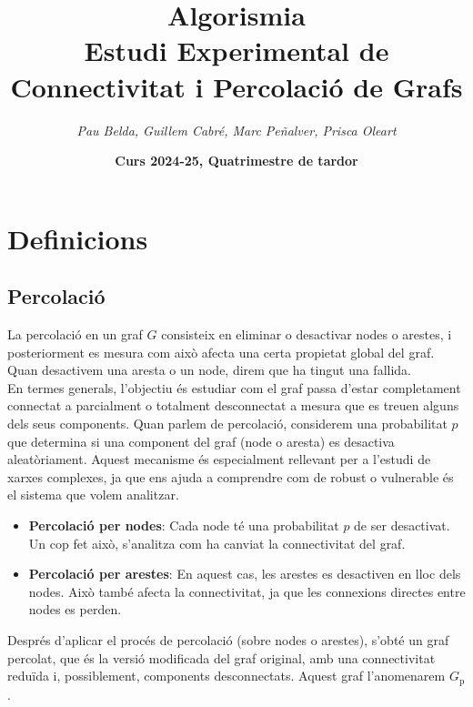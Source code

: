 \documentclass[a4paper]{article}
\title{\textbf{\huge Algorismia}\\[0.5cm]
	\textbf{\Large Estudi Experimental de Connectivitat i Percolació de Grafs}}
\author{\emph{Pau Belda, Guillem Cabré, Marc Peñalver, Prisca Oleart}}
\date{\textbf{Curs 2024-25, Quatrimestre de tardor}}
\begin{document}
	
	\begin{titlepage}
		\clearpage\maketitle
		\thispagestyle{empty}
	\end{titlepage}
	
	\tableofcontents
	\clearpage
	
	\section{Definicions}
		
	\subsection{Percolació}
	
	La percolació en un graf $G$ consisteix en eliminar o desactivar nodes o arestes, i posteriorment es mesura com això afecta una certa propietat global del graf. Quan desactivem una aresta o un node, direm que ha tingut una fallida. \\
	
	En termes generals, l'objectiu és estudiar com el graf passa d'estar completament connectat a parcialment o totalment desconnectat a mesura que es treuen alguns dels seus components. Quan parlem de percolació, considerem una probabilitat $p$ que determina si una component del graf (node o aresta) es desactiva aleatòriament. Aquest mecanisme és especialment rellevant per a l'estudi de xarxes complexes, ja que ens ajuda a comprendre com de robust o vulnerable és el sistema que volem analitzar.
	
	\begin{itemize}
		\item \textbf{Percolació per nodes}: Cada node té una probabilitat $p$ de ser desactivat. Un cop fet això, s'analitza com ha canviat la connectivitat del graf.
		\item \textbf{Percolació per arestes}: En aquest cas, les arestes es desactiven en lloc dels nodes. Això també afecta la connectivitat, ja que les connexions directes entre nodes es perden.
	\end{itemize}
	
	Després d'aplicar el procés de percolació (sobre nodes o arestes), s'obté un graf percolat, que és la versió modificada del graf original, amb una connectivitat reduïda i, possiblement, components desconnectats. Aquest graf l'anomenarem $G_{\text{p}}$.
	
\end{document}
